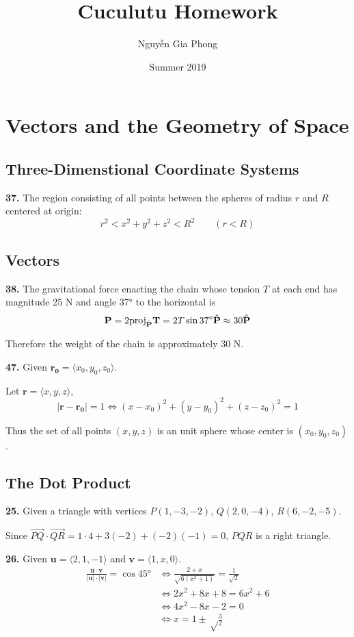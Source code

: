 \documentclass[a4paper,12pt]{article}
\title{Cuculutu Homework}
\author{Nguyễn Gia Phong}
\date{Summer 2019}
\newcommand{\unit}[1]{\hat{\textbf #1}}
\newcommand{\exercise}[1]{\noindent\textbf{#1.}}
\begin{document}
\maketitle
\setcounter{section}{11}
\section{Vectors and the Geometry of Space}
\subsection{Three-Dimenstional Coordinate Systems}

\exercise{37} The region consisting of all points between the spheres of radius
$r$ and $R$ centered at origin:
\[r^2 < x^2 + y^2 + z^2 < R^2\qquad (r < R)\]

\subsection{Vectors}
\exercise{38} The gravitational force enacting the chain whose tension $T$ at
each end has magnitude 25 N and angle \ang{37} to the horizontal is
\[\mathbf{P} = 2\mathrm{proj}_{\unit P}\mathbf{T}
  = 2T\sin\ang{37}\unit{P} \approx 30\unit{P}\]

Therefore the weight of the chain is approximately 30 N.

\exercise{47} Given $\mathbf{r_0} = \langle x_0, y_0, z_0 \rangle$.

Let $\mathbf{r} = \langle x, y, z \rangle$,
\[\left|\mathbf{r} - \mathbf{r_0}\right| = 1
  \iff \left(x - x_0\right)^2 + \left(y - y_0\right)^2
     + \left(z - z_0\right)^2 = 1\]

Thus the set of all points $(x, y, z)$ is an unit sphere whose center is
$\left(x_0, y_0, z_0\right)$.

\subsection{The Dot Product}
\exercise{25} Given a triangle with vertices $P(1, -3, -2)$, $Q(2, 0, -4)$,
$R(6, -2, -5)$.

Since $\overrightarrow{PQ}\cdot\overrightarrow{QR}
= 1 \cdot 4 + 3(-2) + (-2)(-1) = 0$, $PQR$ is a right triangle.

\exercise{26} Given $\mathbf{u} = \langle 2, 1, -1 \rangle$ and
$\mathbf{v} = \langle 1, x, 0 \rangle$.
\begin{align*}
\frac{\mathbf{u}\cdot\mathbf{v}}{|\mathbf{u}|\cdot|\mathbf{v}|} = \cos\ang{45}
&\iff \frac{2 + x}{\sqrt{6\left(x^2 + 1\right)}} = \frac{1}{\sqrt 2}\\
&\iff 2x^2 + 8x + 8 = 6x^2 + 6\\
&\iff 4x^2 - 8x - 2 = 0\\
&\iff x = 1 \pm \sqrt\frac{3}{2}
\end{align*}
\end{document}
